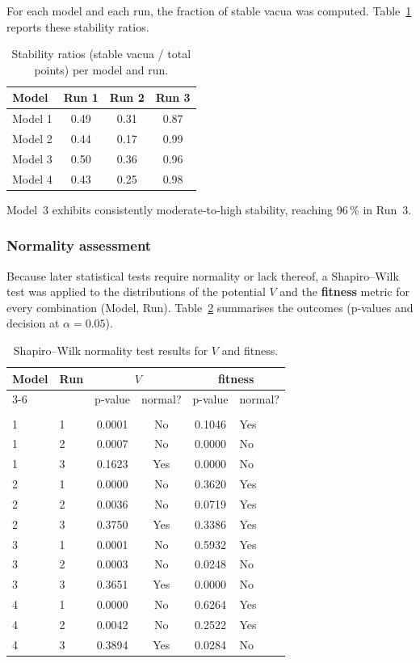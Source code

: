 \documentclass[runningheads]{llncs}
\begin{document}
For each model and each run, the fraction of stable vacua was computed.
Table~\ref{tab:stability_ratios} reports these stability ratios.

\begin{table}[h]
\centering
\caption{Stability ratios (stable vacua / total points) per model and run.}
\label{tab:stability_ratios}
\begin{tabular}{l c c c}
\hline
\textbf{Model} & \textbf{Run 1} & \textbf{Run 2} & \textbf{Run 3} \\
\hline
Model 1 & 0.49 & 0.31 & 0.87 \\
Model 2 & 0.44 & 0.17 & 0.99 \\
Model 3 & 0.50 & 0.36 & 0.96 \\
Model 4 & 0.43 & 0.25 & 0.98 \\
\hline
\end{tabular}
\end{table}

Model~3 exhibits consistently moderate‑to‑high stability, reaching
96\,\% in Run~3.

\subsubsection{Normality assessment}

Because later statistical tests require normality or lack thereof,
a Shapiro–Wilk test was applied to the distributions of the potential
\textbf{\(V\)} and the \textbf{fitness} metric for every combination
(Model, Run). Table~\ref{tab:normality_results} summarises the
outcomes (p‑values and decision at \(\alpha = 0.05\)).

\begin{table}[h]
\centering
\caption{Shapiro–Wilk normality test results for \(V\) and fitness.}
\label{tab:normality_results}
\small
\begin{tabular}{l l c c c l}
\hline
\textbf{Model} & \textbf{Run} & \multicolumn{2}{c}{\(V\)} & \multicolumn{2}{c}{fitness} \\
\cline{3-6}
& & p-value & normal? & p-value & normal? \\
\hline\\[-7pt]
1 & 1 & 0.0001 & No  & 0.1046 & Yes \\
1 & 2 & 0.0007 & No  & 0.0000 & No  \\
1 & 3 & 0.1623 & Yes & 0.0000 & No  \\
2 & 1 & 0.0000 & No  & 0.3620 & Yes \\
2 & 2 & 0.0036 & No  & 0.0719 & Yes \\
2 & 3 & 0.3750 & Yes & 0.3386 & Yes \\
3 & 1 & 0.0001 & No  & 0.5932 & Yes \\
3 & 2 & 0.0003 & No  & 0.0248 & No  \\
3 & 3 & 0.3651 & Yes & 0.0000 & No  \\
4 & 1 & 0.0000 & No  & 0.6264 & Yes \\
4 & 2 & 0.0042 & No  & 0.2522 & Yes \\
4 & 3 & 0.3894 & Yes & 0.0284 & No  \\[2pt]
\hline
\end{tabular}
\end{table}
\end{document}
